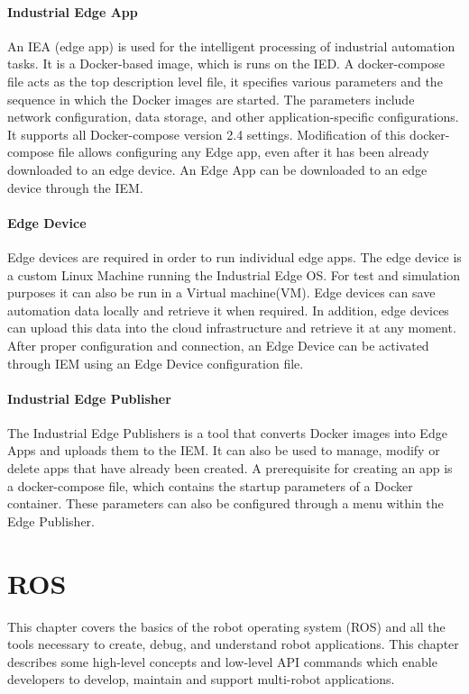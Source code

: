 		\paragraph{Industrial Edge App}
			An \gls{IEA} (edge app) is used for the intelligent processing of industrial automation tasks.\cite{siemensIndustrialEdge} It is a Docker-based image, which is runs on the IED. A docker-compose file acts as the top description level file, it specifies various parameters and the sequence in which the Docker images are started. The parameters include network configuration, data storage, and other application-specific configurations. It supports all Docker-compose version 2.4 settings. Modification of this docker-compose file allows configuring any Edge app, even after it has been already downloaded to an edge device. An Edge App can be downloaded to an edge device through the IEM.
	
		\paragraph{Edge Device}
		Edge devices are required in order to run individual edge apps. The edge device is a custom Linux Machine running the Industrial Edge OS. For test and simulation purposes it can also be run in a Virtual machine(VM). Edge devices can save automation data locally and retrieve it when required. In addition, edge devices can upload this data into the cloud infrastructure and retrieve it at any moment. After proper configuration and connection,  an Edge Device can be activated through IEM using an Edge Device configuration file.
			
		\paragraph{Industrial Edge Publisher}
		The Industrial Edge Publishers is a tool that converts Docker images into Edge Apps and uploads them to the IEM. It can also be used to manage, modify or delete apps that have already been created.\cite{siemensIE_App} A prerequisite for creating an app is a docker-compose file, which contains the startup parameters of a Docker container. These parameters can also be configured through a menu within the Edge Publisher.
			

	
	\section{ROS}
	\label{Grundlagen:ROS2}		
	This chapter covers the basics of the robot operating system (ROS) and all the tools necessary to create, debug, and understand robot applications. This chapter describes some high-level concepts and low-level API commands which enable developers to develop, maintain and support multi-robot applications. \\
	

